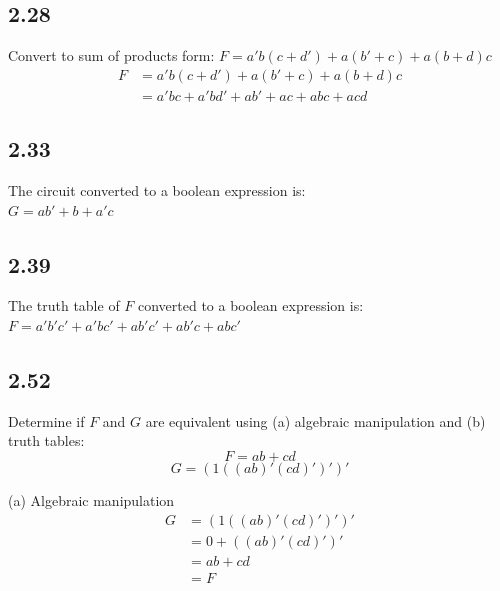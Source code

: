 \documentclass{article}
\begin{document}
\subsection*{2.28}
Convert to sum of products form: $F = a'b(c + d') + a(b' + c) + a(b + d)c$
\begin{align*}
    F &= a'b(c + d') + a(b' + c) + a(b + d)c \\
    &= a'bc + a'bd' + ab' + ac + abc + acd
\end{align*}

\subsection*{2.33}
The circuit converted to a boolean expression is: \\
$ G = ab' + b + a'c $

\subsection*{2.39}
The truth table of $F$ converted to a boolean expression is: \\
$ F = a'b'c' + a'bc' + ab'c' + ab'c + abc' $

\newpage
\subsection*{2.52}
Determine if $F$ and $G$ are equivalent using (a) algebraic manipulation and (b) truth tables: \\
$$ F = ab + cd $$
$$ G = (1((ab)'(cd)')')' $$

\noindent (a) Algebraic manipulation \\
\begin{align*}
    G &= (1((ab)'(cd)')')' \\
    &= 0 + ((ab)'(cd)')' \\
    &= ab + cd \\
    &= F
\end{align*}
\end{document}
